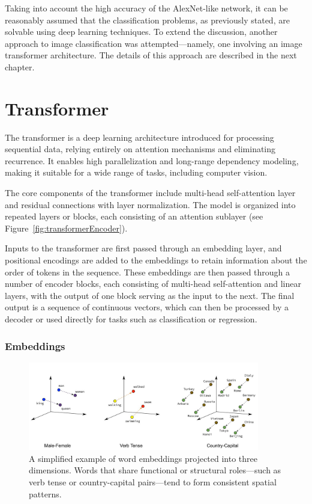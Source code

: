 \documentclass{pracalicmgr}
\begin{document}
Taking into account the high accuracy of the AlexNet-like network, it can be reasonably assumed that the classification problems, as previously stated, are solvable using deep learning techniques. To extend the discussion, another approach to image classification was attempted—namely, one involving an image transformer architecture. The details of this approach are described in the next chapter.


\chapter{Transformer}

The transformer is a deep learning architecture introduced for processing sequential data, relying entirely on attention mechanisms and eliminating recurrence. It enables high parallelization and long-range dependency modeling, making it suitable for a wide range of tasks, including computer vision.

The core components of the transformer include multi-head self-attention layer and residual connections with layer normalization. The model is organized into repeated layers or blocks, each consisting of an attention sublayer (see Figure~\ref{fig:transformerEncoder}).

Inputs to the transformer are first passed through an embedding layer, and positional encodings are added to the embeddings to retain information about the order of tokens in the sequence. These embeddings are then passed through a number of encoder blocks, each consisting of multi-head self-attention and linear layers, with the output of one block serving as the input to the next. The final output is a sequence of continuous vectors, which can then be processed by a decoder or used directly for tasks such as classification or regression.

\subsection{Embeddings}

\begin{figure}[h]
    \centering
    \includegraphics[width=0.9\textwidth]{src/word_embeddings_semantics.png}
    \caption{A simplified example of word embeddings projected into three dimensions. Words that share functional or structural roles—such as verb tense or country-capital pairs—tend to form consistent spatial patterns.}
    \label{fig:embedding_example}
\end{figure}
\end{document}
